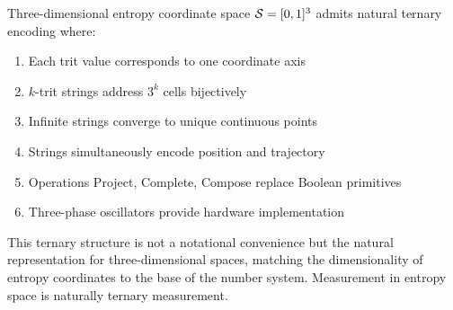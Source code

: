 Three-dimensional entropy coordinate space $\mathcal{S} = [0,1]^3$ admits natural ternary encoding where:
\begin{enumerate}
\item Each trit value corresponds to one coordinate axis
\item $k$-trit strings address $3^k$ cells bijectively
\item Infinite strings converge to unique continuous points
\item Strings simultaneously encode position and trajectory
\item Operations Project, Complete, Compose replace Boolean primitives
\item Three-phase oscillators provide hardware implementation
\end{enumerate}

This ternary structure is not a notational convenience but the natural representation for three-dimensional spaces, matching the dimensionality of entropy coordinates to the base of the number system. Measurement in entropy space is naturally ternary measurement.
